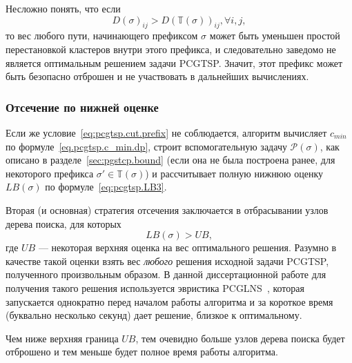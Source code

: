 Несложно понять, что если
\begin{equation}
  \label{eq:pcgtsp.cut.prefix}
  D(\sigma)_{ij} > D(\mathbb T(\sigma))_{ij},
  \forall i, j
  ,
\end{equation}
то вес любого пути,
начинающего префиксом $\sigma$
может быть уменьшен простой
перестановкой кластеров внутри этого префикса,
и следовательно заведомо
не является оптимальным решением задачи PCGTSP.
Значит, этот префикс может быть
безопасно отброшен и не участвовать в
дальнейших вычислениях.

\subsubsection{Отсечение по нижней оценке}

Если же условие~\eqref{eq:pcgtsp.cut.prefix}
не соблюдается,
алгоритм вычисляет
$c_{min}$
по формуле~\eqref{eq.pcgtsp.c_min.dp},
строит вспомогательную задачу
$\mathcal P(\sigma)$,
как описано в разделе~\ref{sec:pgstcp.bound}
(если она не была построена ранее,
для некоторого префикса
$\sigma' \in \mathbb T(\sigma)$)
и рассчитывает полную нижнюю оценку
$LB(\sigma)$
по формуле~\eqref{eq:pcgtsp.LB3}.

Вторая
(и основная)
стратегия отсечения заключается в отбрасывании узлов дерева поиска,
для которых
\begin{equation}
  \label{eq:pcgtsp.cut.lb}
  LB(\sigma)>UB
  ,
\end{equation}
где
$UB$ --- некоторая верхняя оценка на вес оптимального решения.
Разумно в качестве такой оценки
взять вес
\textit{любого}
решения исходной задачи PCGTSP,
полученного произвольным образом.
В данной диссертационной работе
для получения такого решения
используется эвристика
PCGLNS~\cite{KKP-optima2020},
которая запускается однократно
перед началом работы алгоритма
и за короткое время
(буквально несколько секунд)
дает решение,
близкое к оптимальному.

Чем ниже верхняя граница $UB$,
тем очевидно больше узлов дерева поиска
будет отброшено и тем меньше будет
полное время работы алгоритма.
